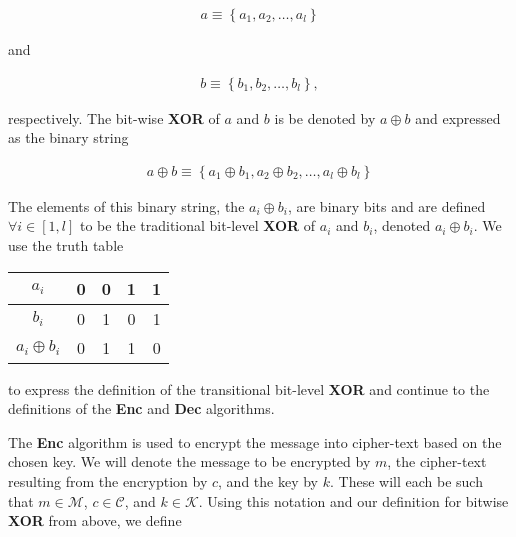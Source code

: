 \documentclass[../midterm.tex]{subfiles}
\begin{document}
\begin{flushleft}
\begin{align*}
a \equiv \left\{ a_1, a_2, \dots, a_l \right\}
\end{align*} 

and

\begin{align*}
b \equiv \left\{ b_1, b_2, \dots, b_l \right\},
\end{align*}

respectively. The bit-wise \textbf{XOR} of $a$ and $b$ is be denoted by $a \oplus b$ and expressed as the binary string

\begin{align*}
a \oplus b \equiv \left\{ a_1 \oplus b_1, a_2 \oplus b_2, \dots, a_l \oplus b_l \right\}
\end{align*}

The elements of this binary string, the $a_i \oplus b_i$, are binary bits and are defined $\forall i \in \left[ 1, l \right]$ to be the traditional bit-level \textbf{XOR} of $a_i$ and $b_i$, denoted $a_i \oplus b_i$. We use the truth table

\end{flushleft} \begin{center}
\begin{tabular}{c | c c c c }
$a_i$ & 0 & 0 & 1 & 1 \\
\hline
$b_i$ & 0 & 1 & 0 & 1 \\
\hline
\hline
$a_i \oplus b_i$ & 0 & 1 & 1 & 0
\end{tabular}
\end{center} \begin{flushleft}

to express the definition of the transitional bit-level \textbf{XOR} and continue to the definitions of the {\selectfont \textbf{Enc}} and {\selectfont \textbf{Dec}} algorithms. \newline

The {\selectfont \textbf{Enc}} algorithm is used to encrypt the message into cipher-text based on the chosen key.  We will denote the message to be encrypted by $m$, the cipher-text resulting from the encryption by $c$, and the key by $k$.  These will each be such that $m \in \mathcal{M}$, $c \in \mathcal{C}$, and $k \in \mathcal{K}$.  Using this notation and our definition for bitwise \textbf{XOR} from above, we define


\end{flushleft}
\end{document}
